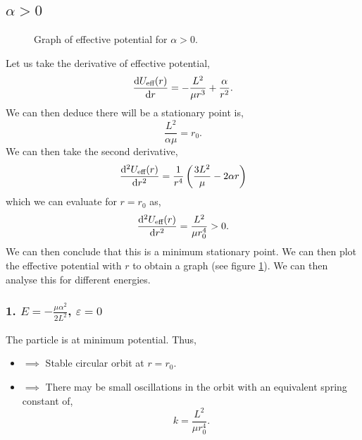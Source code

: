 \documentclass{book}
\begin{document}
\subsection{$\alpha > 0$}
\begin{figure}
    \centering
    \caption{Graph of effective potential for $\alpha > 0$.}
    \label{fig:alphamorethan}
\end{figure}
Let us take the derivative of effective potential,
\begin{equation}
    \dv{U_\text{eff}(r)}{r} = -\frac{L^2}{\mu r^3} + \frac{\alpha}{r^2}.
\end{equation}
We can then deduce there will be a stationary point is,
\begin{equation}
    \frac{L^2}{\alpha \mu} = r_0.
\end{equation}
We can then take the second derivative,
\begin{equation}
    \dv[2]{U_\text{eff}(r)}{r} = \frac{1}{r^4}\left(\frac{3L^2}{\mu} - 2\alpha r\right)
\end{equation}
which we can evaluate for $r = r_0$ as,
\begin{equation}
    \dv[2]{U_\text{eff}(r)}{r} = \frac{L^2}{\mu r_0^4} > 0.
\end{equation}
We can then conclude that this is a minimum stationary point. We can then plot the effective potential with $r$ to obtain a graph (see figure \ref{fig:alphamorethan}). We can then analyse this for different energies. 
\subsubsection{1. $E = -\frac{\mu\alpha^2}{2L^2}$, $\varepsilon=0$}
The particle is at minimum potential. Thus,
\begin{itemize}
    \item $\implies$ Stable circular orbit at $r = r_0$.
    \item $\implies$ There may be small oscillations in the orbit with an equivalent spring constant of,
    \begin{equation}
        k = \frac{L^2}{\mu r_0^4}.
    \end{equation}
\end{itemize}
\end{document}
